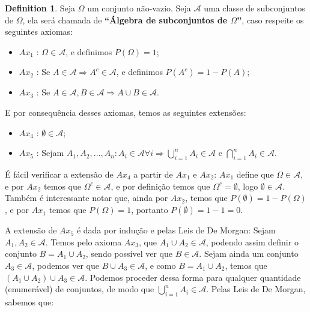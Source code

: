 \documentclass[
]{article}
\providecommand{\tightlist}{%
  \setlength{\itemsep}{0pt}\setlength{\parskip}{0pt}}
\theoremstyle{definition}
\newtheorem{definition}{Definition}[section]
\theoremstyle{definition}
\theoremstyle{definition}
\theoremstyle{definition}
\theoremstyle{remark}
\begin{document}
\begin{definition}

Seja \(\Omega\) um conjunto não-vazio. Seja \(\mathcal{A}\) uma classe de subconjuntos de \(\Omega\), ela será chamada de \textbf{``Álgebra de subconjuntos de \(\Omega\)''}, caso respeite os seguintes axiomas:

\begin{itemize}
\tightlist
\item
  \(Ax_{1}\) : \(\Omega \in \mathcal{A}\), e definimos \(P(\Omega) = 1\);
\item
  \(Ax_{2}\) : Se \(A \in \mathcal{A} \Rightarrow A^{c} \in \mathcal{A}\), e definimos \(P(A^{c}) = 1 - P(A)\);
\item
  \(Ax_{3}\) : Se \(A \in \mathcal{A}, B \in \mathcal{A} \Rightarrow A \cup B \in \mathcal{A}\).
\end{itemize}

E por consequência desses axiomas, temos as seguintes extensões:

\begin{itemize}
\tightlist
\item
  \(Ax_{4}\) : \(\emptyset \in \mathcal{A}\);
\item
  \(Ax_{5}\) : Sejam \(A_{1}, A_{2}, \dots, A_{n} : A_{i} \in \mathcal{A} \forall i \Rightarrow \bigcup_{i=1}^{n}A_{i} \in \mathcal{A}\) e \(\bigcap_{i = 1}^{n}A_{i} \in \mathcal{A}\).
\end{itemize}

\end{definition}

É fácil verificar a extensão de \(Ax_{4}\) a partir de \(Ax_{1} \text{ e } Ax_{2}\): \(Ax_{1}\) define que \(\Omega \in \mathcal{A}\), e por \(Ax_{2}\) temos que \(\Omega^{c} \in \mathcal{A}\), e por definição temos que \(\Omega^{c} = \emptyset\), logo \(\emptyset \in \mathcal{A}\). Também é interessante notar que, ainda por \(Ax_{2}\), temos que \(P(\emptyset) = 1 - P(\Omega)\), e por \(Ax_{1}\) temos que \(P(\Omega) = 1\), portanto \(P(\emptyset) = 1 - 1 = 0\).

A extensão de \(Ax_{5}\) é dada por indução e pelas Leis de De Morgan: Sejam \(A_{1}, A_{2} \in \mathcal{A}\). Temos pelo axioma \(Ax_{3}\), que \(A_{1} \cup A_{2} \in \mathcal{A}\), podendo assim definir o conjunto \(B = A_{1} \cup A_{2}\), sendo possível ver que \(B \in \mathcal{A}\). Sejam ainda um conjunto \(A_{3} \in \mathcal{A}\), podemos ver que \(B \cup A_{3} \in \mathcal{A}\), e como \(B = A_{1} \cup A_{2}\), temos que \((A_{1} \cup A_{2}) \cup A_{3} \in \mathcal{A}\). Podemos proceder dessa forma para qualquer quantidade (enumerável) de conjuntos, de modo que \(\bigcup_{i = 1}^{n}A_{i} \in \mathcal{A}\). Pelas Leis de De Morgan, sabemos que:
\end{document}
